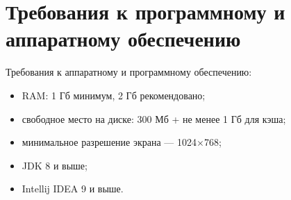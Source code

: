 \section{Требования к программному и аппаратному обеспечению} \label{sub23}

Требования к аппаратному и программному обеспечению: 

\begin{itemize}
\item{RAM: 1 Гб минимум, 2 Гб рекомендовано;}
\item{свободное место на диске: 300 Мб + не менее 1 Гб для кэша;}
\item{минимальное разрешение экрана — 1024$\times$768;}
\item{JDK 8 и выше;}
\item{Intellij IDEA 9 и выше.}
\end{itemize}
